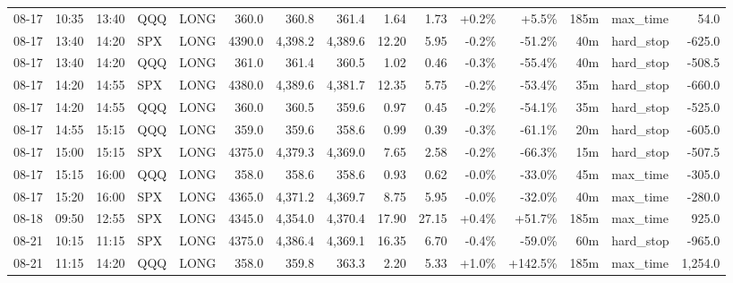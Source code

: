 \documentclass[11pt,a4paper,twoside]{article}
\begin{document}
\begin{landscape}
\begin{center}
\begin{longtable}{>{\color{txtmain}}l l l l l r r r r r r r r >{\color{txtmain}}l r}
08-17 & 10:35 & 13:40 & QQQ & LONG & 360.0 & 360.8 & 361.4 & 1.64 & 1.73 & \textcolor{wingreen}{+0.2\%} & \textcolor{wingreen}{+5.5\%} & 185m & max\_time & \textcolor{wingreen}{54.0} \\
08-17 & 13:40 & 14:20 & SPX & LONG & 4390.0 & 4,398.2 & 4,389.6 & 12.20 & 5.95 & \textcolor{lossred}{-0.2\%} & \textcolor{lossred}{-51.2\%} & 40m & hard\_stop & \textcolor{lossred}{-625.0} \\
08-17 & 13:40 & 14:20 & QQQ & LONG & 361.0 & 361.4 & 360.5 & 1.02 & 0.46 & \textcolor{lossred}{-0.3\%} & \textcolor{lossred}{-55.4\%} & 40m & hard\_stop & \textcolor{lossred}{-508.5} \\
08-17 & 14:20 & 14:55 & SPX & LONG & 4380.0 & 4,389.6 & 4,381.7 & 12.35 & 5.75 & \textcolor{lossred}{-0.2\%} & \textcolor{lossred}{-53.4\%} & 35m & hard\_stop & \textcolor{lossred}{-660.0} \\
08-17 & 14:20 & 14:55 & QQQ & LONG & 360.0 & 360.5 & 359.6 & 0.97 & 0.45 & \textcolor{lossred}{-0.2\%} & \textcolor{lossred}{-54.1\%} & 35m & hard\_stop & \textcolor{lossred}{-525.0} \\
08-17 & 14:55 & 15:15 & QQQ & LONG & 359.0 & 359.6 & 358.6 & 0.99 & 0.39 & \textcolor{lossred}{-0.3\%} & \textcolor{lossred}{-61.1\%} & 20m & hard\_stop & \textcolor{lossred}{-605.0} \\
08-17 & 15:00 & 15:15 & SPX & LONG & 4375.0 & 4,379.3 & 4,369.0 & 7.65 & 2.58 & \textcolor{lossred}{-0.2\%} & \textcolor{lossred}{-66.3\%} & 15m & hard\_stop & \textcolor{lossred}{-507.5} \\
08-17 & 15:15 & 16:00 & QQQ & LONG & 358.0 & 358.6 & 358.6 & 0.93 & 0.62 & \textcolor{lossred}{-0.0\%} & \textcolor{lossred}{-33.0\%} & 45m & max\_time & \textcolor{lossred}{-305.0} \\
08-17 & 15:20 & 16:00 & SPX & LONG & 4365.0 & 4,371.2 & 4,369.7 & 8.75 & 5.95 & \textcolor{lossred}{-0.0\%} & \textcolor{lossred}{-32.0\%} & 40m & max\_time & \textcolor{lossred}{-280.0} \\
08-18 & 09:50 & 12:55 & SPX & LONG & 4345.0 & 4,354.0 & 4,370.4 & 17.90 & 27.15 & \textcolor{wingreen}{+0.4\%} & \textcolor{wingreen}{+51.7\%} & 185m & max\_time & \textcolor{wingreen}{925.0} \\
08-21 & 10:15 & 11:15 & SPX & LONG & 4375.0 & 4,386.4 & 4,369.1 & 16.35 & 6.70 & \textcolor{lossred}{-0.4\%} & \textcolor{lossred}{-59.0\%} & 60m & hard\_stop & \textcolor{lossred}{-965.0} \\
08-21 & 11:15 & 14:20 & QQQ & LONG & 358.0 & 359.8 & 363.3 & 2.20 & 5.33 & \textcolor{wingreen}{+1.0\%} & \textcolor{wingreen}{+142.5\%} & 185m & max\_time & \textcolor{wingreen}{1,254.0} \\

\end{longtable}
\end{center}
\end{landscape}
\end{document}
